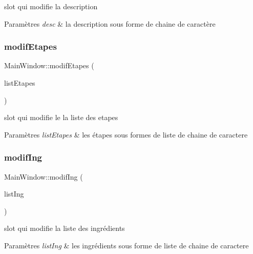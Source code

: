 slot qui modifie la description 


\begin{DoxyParams}{Paramètres}
{\em desc} & la description sous forme de chaine de caractère \\
\hline
\end{DoxyParams}
\mbox{\label{classMainWindow_a323b852ca5189a18a81107f72857a7d8}} 
\subsubsection{\texorpdfstring{modif\+Etapes}{modifEtapes}}
{\footnotesize\ttfamily Main\+Window\+::modif\+Etapes (\begin{DoxyParamCaption}\item[{Q\+String\+List}]{list\+Etapes }\end{DoxyParamCaption})\hspace{0.3cm}{\ttfamily [slot]}}



slot qui modifie le la liste des etapes 


\begin{DoxyParams}{Paramètres}
{\em list\+Etapes} & les étapes sous formes de liste de chaine de caractere \\
\hline
\end{DoxyParams}
\mbox{\label{classMainWindow_af9c1008d472c1cbe3ee63a2ee691eebb}} 
\subsubsection{\texorpdfstring{modif\+Ing}{modifIng}}
{\footnotesize\ttfamily Main\+Window\+::modif\+Ing (\begin{DoxyParamCaption}\item[{Q\+String\+List}]{list\+Ing }\end{DoxyParamCaption})\hspace{0.3cm}{\ttfamily [slot]}}



slot qui modifie la liste des ingrédients 


\begin{DoxyParams}{Paramètres}
{\em list\+Ing} & les ingrédients sous forme de liste de chaine de caractere \\
\hline
\end{DoxyParams}
\mbox{\label{classMainWindow_af8df6e9620b77968cc947db8bbaa6ea7}} 
